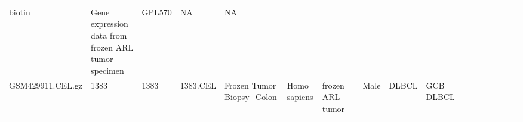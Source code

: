 \documentclass[]{article}
\begin{document}
\begin{longtable}[]{@{}lllllllrllllllllll@{}}
\begin{minipage}[t]{0.01\columnwidth}
biotin\strut
\end{minipage} & \begin{minipage}[t]{0.08\columnwidth}\raggedright
Gene expression data from frozen ARL tumor specimen\strut
\end{minipage} & \begin{minipage}[t]{0.01\columnwidth}\raggedright
GPL570\strut
\end{minipage} & \begin{minipage}[t]{0.00\columnwidth}\raggedright
NA\strut
\end{minipage} & \begin{minipage}[t]{0.01\columnwidth}\raggedright
NA\strut
\end{minipage}\tabularnewline
\begin{minipage}[t]{0.03\columnwidth}\raggedright
GSM429911.CEL.gz\strut
\end{minipage} & \begin{minipage}[t]{0.02\columnwidth}\raggedright
1383\strut
\end{minipage} & \begin{minipage}[t]{0.01\columnwidth}\raggedright
1383\strut
\end{minipage} & \begin{minipage}[t]{0.02\columnwidth}\raggedright
1383.CEL\strut
\end{minipage} & \begin{minipage}[t]{0.06\columnwidth}\raggedright
Frozen Tumor Biopsy\_Colon\strut
\end{minipage} & \begin{minipage}[t]{0.02\columnwidth}\raggedright
Homo sapiens\strut
\end{minipage} & \begin{minipage}[t]{0.04\columnwidth}\raggedright
frozen ARL tumor\strut
\end{minipage} & \begin{minipage}[t]{0.05\columnwidth}\raggedleft
35\strut
\end{minipage} & \begin{minipage}[t]{0.04\columnwidth}\raggedright
Male\strut
\end{minipage} & \begin{minipage}[t]{0.06\columnwidth}\raggedright
DLBCL\strut
\end{minipage} & \begin{minipage}[t]{0.06\columnwidth}\raggedright
GCB DLBCL\strut
\end{minipage} & \begin{minipage}[t]{0.04\columnwidth}\raggedright

\end{minipage}
\end{longtable}
\end{document}
